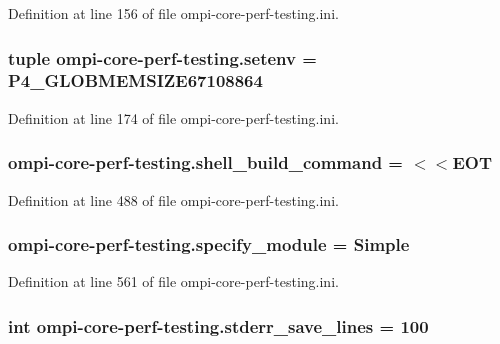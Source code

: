 Definition at line 156 of file ompi-\/core-\/perf-\/testing.\-ini.

\hypertarget{namespaceompi-core-perf-testing_a1edb160fbade0abbd90944224c10612e}{
\subsubsection[{setenv}]{\setlength{\rightskip}{0pt plus 5cm}tuple ompi-\/core-\/perf-\/testing.\-setenv = P4\-\_\-\-G\-L\-O\-B\-M\-E\-M\-S\-I\-Z\-E67108864}}\label{namespaceompi-core-perf-testing_a1edb160fbade0abbd90944224c10612e}


Definition at line 174 of file ompi-\/core-\/perf-\/testing.\-ini.

\hypertarget{namespaceompi-core-perf-testing_a0bd18f93397d6a31113bad591de7ada2}{
\subsubsection[{shell\-\_\-build\-\_\-command}]{\setlength{\rightskip}{0pt plus 5cm}ompi-\/core-\/perf-\/testing.\-shell\-\_\-build\-\_\-command = $<$$<$E\-O\-T}}\label{namespaceompi-core-perf-testing_a0bd18f93397d6a31113bad591de7ada2}


Definition at line 488 of file ompi-\/core-\/perf-\/testing.\-ini.

\hypertarget{namespaceompi-core-perf-testing_a351d16c6270dff5f1cd7d4c05c279e7d}{
\subsubsection[{specify\-\_\-module}]{\setlength{\rightskip}{0pt plus 5cm}ompi-\/core-\/perf-\/testing.\-specify\-\_\-module = Simple}}\label{namespaceompi-core-perf-testing_a351d16c6270dff5f1cd7d4c05c279e7d}


Definition at line 561 of file ompi-\/core-\/perf-\/testing.\-ini.

\hypertarget{namespaceompi-core-perf-testing_a6be1f4c75e49b8955241e24d4e26ed03}{
\subsubsection[{stderr\-\_\-save\-\_\-lines}]{\setlength{\rightskip}{0pt plus 5cm}int ompi-\/core-\/perf-\/testing.\-stderr\-\_\-save\-\_\-lines = 100}}\label{namespaceompi-core-perf-testing_a6be1f4c75e49b8955241e24d4e26ed03}


